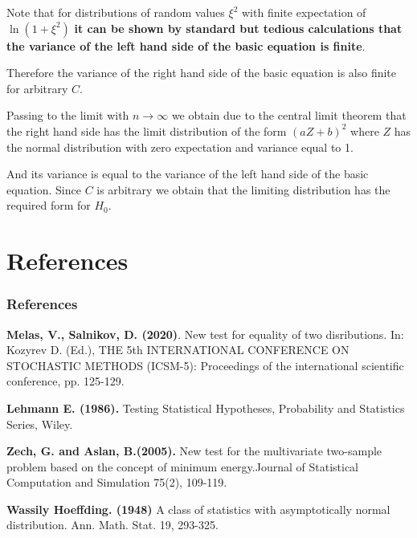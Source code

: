 \documentclass[slidestop,usepdftitle=false]{beamer}
\begin{document}
 \begin{slide}
 \bigskip
\bigskip


 Note  that for distributions of random values $ \xi^2$  with finite expectation of $\ln (1+ \xi^2)$ {\bf it can be shown by standard but tedious calculations that the variance of the left hand side of the basic equation is finite}.

\bigskip
\bigskip

 Therefore the variance of the right hand side of the basic equation is also finite for arbitrary $C$.
\end{slide}
\begin{slide}
\bigskip
\bigskip

Passing to the limit with $n\to \infty$ we obtain due to the central limit theorem that the right hand side has the limit distribution of the form $(aZ+b)^2$ where  $Z$ has the normal distribution with zero expectation and variance equal to 1.

\bigskip
\bigskip

And its variance  is equal to the variance of the left hand side  of the basic equation. Since $C$ is arbitrary we obtain that the limiting distribution has the required form for $H_0$.
 \end{slide}


\section{References}
\begin{slide}
\frametitle{References}

{\bf Melas, V., Salnikov, D. (2020)}. New test for equality of two disributions. In: Kozyrev D. (Ed.), THE 5th INTERNATIONAL CONFERENCE ON STOCHASTIC METHODS (ICSM-5): Proceedings of the international scientific conference, pp. 125-129.

{\bf Lehmann E. (1986).}  Testing  Statistical  Hypotheses,  Probability  and  Statistics  Series,  Wiley.

{\bf Zech,  G. and Aslan, B.(2005).}   New test for the multivariate two-sample problem based on the concept of minimum energy.Journal of Statistical Computation and Simulation 75(2), 109-119.


 {\bf Wassily Hoeffding. (1948)} A class of statistics with asymptotically normal distribution.
Ann. Math. Stat. 19, 293-325.


\end{slide}
\end{document}
